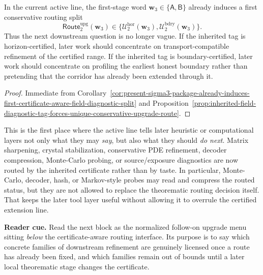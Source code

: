 \begin{corollary}
\label{cor:present-sigma3-package-already-induces-first-conservative-upgrade-routing-split}
In the current active line, the first-stage word \(\mathbf w_3\in\{\mathsf A,\mathsf B\}\) already induces a first conservative routing split
\[
  \mathsf{Route}^{\mathrm{upg}}_{2}(\mathbf w_3)
  \in
  \{\mathcal U^{\mathrm{hor}}_{2}(\mathbf w_3),\mathcal U^{\mathrm{bdry}}_{2}(\mathbf w_3)\}.
\]
Thus the next downstream question is no longer vague. If the inherited tag is horizon-certified, later work should concentrate on transport-compatible refinement of the certified range. If the inherited tag is boundary-certified, later work should concentrate on profiling the earliest honest boundary rather than pretending that the corridor has already been extended through it.
\end{corollary}

\begin{proof}
Immediate from Corollary~\ref{cor:present-sigma3-package-already-induces-first-certificate-aware-field-diagnostic-split} and Proposition~\ref{prop:inherited-field-diagnostic-tag-forces-unique-conservative-upgrade-route}.
\end{proof}

\begin{remark}
\label{rem:what-this-upgrade-routing-interface-now-buys}
This is the first place where the active line tells later heuristic or computational layers not only what they may \emph{say}, but also what they should \emph{do next}. Matrix sharpening, crystal stabilization, conservative PDE refinement, decoder compression, Monte-Carlo probing, or source/exposure diagnostics are now routed by the inherited certificate rather than by taste. In particular, Monte-Carlo, decoder, hash, or Markov-style probes may read and compress the routed status, but they are not allowed to replace the theorematic routing decision itself. That keeps the later tool layer useful without allowing it to overrule the certified extension line.
\end{remark}




\noindent\textbf{Reader cue.} Read the next block as the normalized follow-on upgrade menu sitting \emph{below} the certificate-aware routing interface. Its purpose is to say which concrete families of downstream refinement are genuinely licensed once a route has already been fixed, and which families remain out of bounds until a later local theorematic stage changes the certificate.

